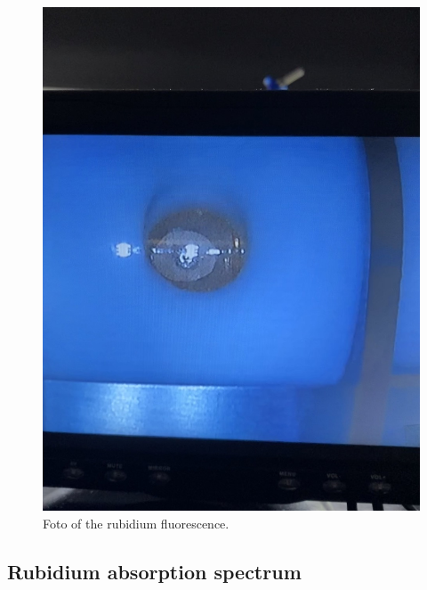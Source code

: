 \begin{figure}
    \centering
    \includegraphics[width=\textwidth]{fl.jpeg}
    \caption{Foto of the rubidium fluorescence.}
\end{figure}

\subsection{Rubidium absorption spectrum}

